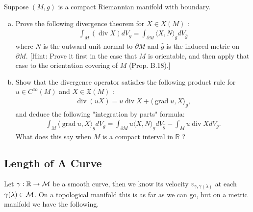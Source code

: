 \documentclass[12pt]{article} %
\begin{document}
\begin{thma}
Suppose $(M, g)$ is a compact Riemannian manifold with boundary.
\begin{enumerate}[(a)]
    \item Prove the following divergence theorem for $X \in X(M)$ :
\begin{align*}
\int_{M}(\operatorname{div} X) d V_{g}=\int_{\partial M}\langle X, N\rangle_{g} d V_{\widehat{g}}
\end{align*}
where $N$ is the outward unit normal to $\partial M$ and $\hat{g}$ is the induced metric on $\partial M$. [Hint: Prove it first in the case that $M$ is orientable, and then apply that case to the orientation covering of $M$ (Prop. B.18).]
\item Show that the divergence operator satisfies the following product rule for $u \in C^{\infty}(M)$ and $X \in \mathfrak{X}(M)$ :
\begin{align*}
\operatorname{div}(u X)=u \operatorname{div} X+\langle\operatorname{grad} u, X\rangle_{g},
\end{align*}
and deduce the following "integration by parts" formula:
\begin{align*}
\int_{M}\langle\operatorname{grad} u, X\rangle_{g} d V_{g}=\int_{\partial M} u\langle X, N\rangle_{g} d V_{\widehat{g}}-\int_{M} u \operatorname{div} X d V_{g} .
\end{align*}
What does this say when $M$ is a compact interval in $\mathbb{R}$ ?
\end{enumerate}
\end{thma}

\subsection{Length of A Curve}

Let $\gamma:\mathbb{R}\to\mathcal{M}$ be a smooth curve, then we know its velocity $v_{\gamma,\gamma(\lambda)}$ at each $\gamma(\lambda)\in\mathcal{M}$. On a topological manifold this is as far as we can go, but on a metric manifold we have the following. 
\end{document}
